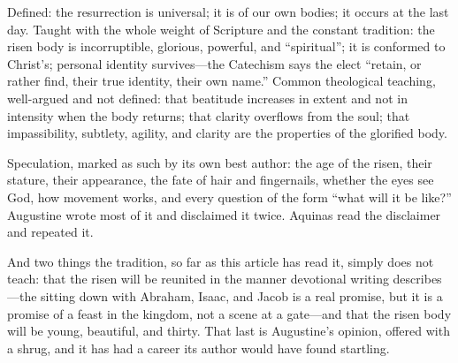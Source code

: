 Defined: the resurrection is universal; it is of our own bodies; it occurs at the last day. Taught with the whole weight of Scripture and the constant tradition: the risen body is incorruptible, glorious, powerful, and ``spiritual''; it is conformed to Christ's; personal identity survives---the Catechism says the elect ``retain, or rather find, their true identity, their own name.'' Common theological teaching, well-argued and not defined: that beatitude increases in extent and not in intensity when the body returns; that clarity overflows from the soul; that impassibility, subtlety, agility, and clarity are the properties of the glorified body.

Speculation, marked as such by its own best author: the age of the risen, their stature, their appearance, the fate of hair and fingernails, whether the eyes see God, how movement works, and every question of the form ``what will it be like?'' Augustine wrote most of it and disclaimed it twice. Aquinas read the disclaimer and repeated it.

And two things the tradition, so far as this article has read it, simply does not teach: that the risen will be reunited in the manner devotional writing describes---the sitting down with Abraham, Isaac, and Jacob is a real promise, but it is a promise of a feast in the kingdom, not a scene at a gate---and that the risen body will be young, beautiful, and thirty. That last is Augustine's opinion, offered with a shrug, and it has had a career its author would have found startling.
